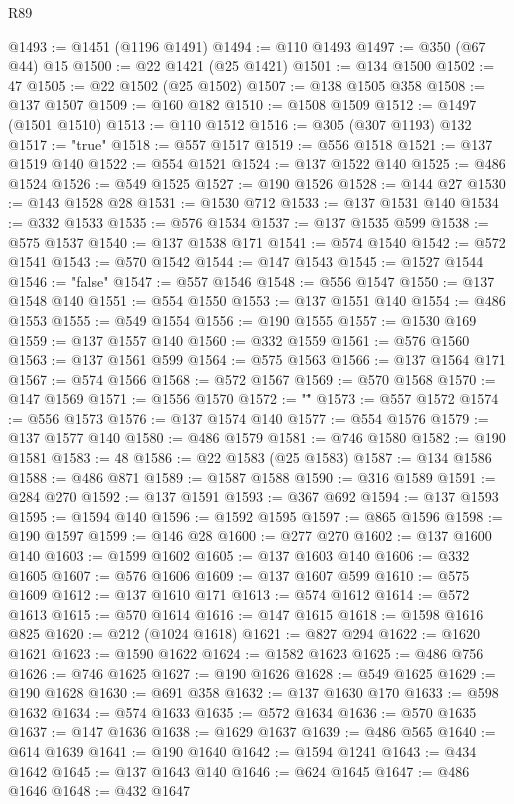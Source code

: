 \begin{lexlean}{R89}
\begin{coremodule}
@1493 := @1451 (@1196 @1491)
@1494 := @110 @1493
@1497 := @350 (@67 @44) @15
@1500 := @22 @1421 (@25 @1421)
@1501 := @134 @1500
@1502 := 47
@1505 := @22 @1502 (@25 @1502)
@1507 := @138 @1505 @358
@1508 := @137 @1507
@1509 := @160 @182
@1510 := @1508 @1509
@1512 := @1497 (@1501 @1510)
@1513 := @110 @1512
@1516 := @305 (@307 @1193) @132
@1517 := "true"
@1518 := @557 @1517
@1519 := @556 @1518
@1521 := @137 @1519 @140
@1522 := @554 @1521
@1524 := @137 @1522 @140
@1525 := @486 @1524
@1526 := @549 @1525
@1527 := @190 @1526
@1528 := @144 @27
@1530 := @143 @1528 @28
@1531 := @1530 @712
@1533 := @137 @1531 @140
@1534 := @332 @1533
@1535 := @576 @1534
@1537 := @137 @1535 @599
@1538 := @575 @1537
@1540 := @137 @1538 @171
@1541 := @574 @1540
@1542 := @572 @1541
@1543 := @570 @1542
@1544 := @147 @1543
@1545 := @1527 @1544
@1546 := "false"
@1547 := @557 @1546
@1548 := @556 @1547
@1550 := @137 @1548 @140
@1551 := @554 @1550
@1553 := @137 @1551 @140
@1554 := @486 @1553
@1555 := @549 @1554
@1556 := @190 @1555
@1557 := @1530 @169
@1559 := @137 @1557 @140
@1560 := @332 @1559
@1561 := @576 @1560
@1563 := @137 @1561 @599
@1564 := @575 @1563
@1566 := @137 @1564 @171
@1567 := @574 @1566
@1568 := @572 @1567
@1569 := @570 @1568
@1570 := @147 @1569
@1571 := @1556 @1570
@1572 := "\""
@1573 := @557 @1572
@1574 := @556 @1573
@1576 := @137 @1574 @140
@1577 := @554 @1576
@1579 := @137 @1577 @140
@1580 := @486 @1579
@1581 := @746 @1580
@1582 := @190 @1581
@1583 := 48
@1586 := @22 @1583 (@25 @1583)
@1587 := @134 @1586
@1588 := @486 @871
@1589 := @1587 @1588
@1590 := @316 @1589
@1591 := @284 @270
@1592 := @137 @1591
@1593 := @367 @692
@1594 := @137 @1593
@1595 := @1594 @140
@1596 := @1592 @1595
@1597 := @865 @1596
@1598 := @190 @1597
@1599 := @146 @28
@1600 := @277 @270
@1602 := @137 @1600 @140
@1603 := @1599 @1602
@1605 := @137 @1603 @140
@1606 := @332 @1605
@1607 := @576 @1606
@1609 := @137 @1607 @599
@1610 := @575 @1609
@1612 := @137 @1610 @171
@1613 := @574 @1612
@1614 := @572 @1613
@1615 := @570 @1614
@1616 := @147 @1615
@1618 := @1598 @1616 @825
@1620 := @212 (@1024 @1618)
@1621 := @827 @294
@1622 := @1620 @1621
@1623 := @1590 @1622
@1624 := @1582 @1623
@1625 := @486 @756
@1626 := @746 @1625
@1627 := @190 @1626
@1628 := @549 @1625
@1629 := @190 @1628
@1630 := @691 @358
@1632 := @137 @1630 @170
@1633 := @598 @1632
@1634 := @574 @1633
@1635 := @572 @1634
@1636 := @570 @1635
@1637 := @147 @1636
@1638 := @1629 @1637
@1639 := @486 @565
@1640 := @614 @1639
@1641 := @190 @1640
@1642 := @1594 @1241
@1643 := @434 @1642
@1645 := @137 @1643 @140
@1646 := @624 @1645
@1647 := @486 @1646
@1648 := @432 @1647

\end{coremodule}
\end{lexlean}

